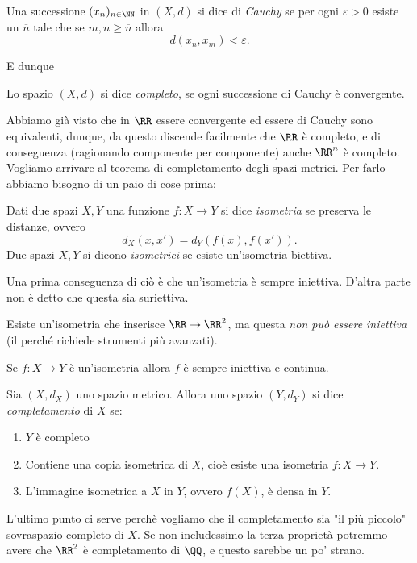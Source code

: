 \documentclass[11pt]{scrartcl}
\begin{document}
	\begin{definition}
		Una successione $(x_n)_{n\in\NN}$ in $(X,d)$ si dice di \textit{Cauchy} se per ogni $\varepsilon>0$ esiste un $\overline{n}$ tale che se $m,n\ge \overline{n}$ allora
		$$d\left(x_n,x_m\right)<\varepsilon.$$
	\end{definition}
	E dunque
	\begin{definition}
		Lo spazio $(X,d)$ si dice \textit{completo}, se ogni successione di Cauchy è convergente.
	\end{definition}
	Abbiamo già visto che in $\RR$ essere convergente ed essere di Cauchy sono equivalenti, dunque, da questo discende facilmente che $\RR$ è completo, e di conseguenza (ragionando componente per componente) anche $\RR^n$ è completo. \\
	Vogliamo arrivare al teorema di completamento degli spazi metrici. Per farlo abbiamo bisogno di un paio di cose prima:
	\begin{definition}[Isometria]
		Dati due spazi $X,Y$ una funzione $f:X\to Y$ si dice \textit{isometria} se preserva le distanze, ovvero
		$$d_X(x,x')=d_Y\left(f(x),f(x')\right).$$
		Due spazi $X,Y$ si dicono \textit{isometrici} se esiste un'isometria biettiva.
	\end{definition}
	Una prima conseguenza di ciò è che un'isometria è sempre iniettiva. D'altra parte non è detto che questa sia suriettiva.
	\begin{example}
		Esiste un'isometria che inserisce $\RR\to\RR^2$, ma questa \textit{non può essere iniettiva} (il perché richiede strumenti più avanzati).
	\end{example}
	\begin{remark}
		Se $f:X\to Y$ è un'isometria allora $f$ è sempre iniettiva e continua.
	\end{remark}
	\begin{definition}[Completamento]
		Sia $(X,d_X)$ uno spazio metrico. Allora uno spazio $(Y,d_Y)$ si dice \textit{completamento} di $X$ se:
		\begin{enumerate}
			\item $Y$ è completo
			\item Contiene una copia isometrica di $X$, cioè esiste una isometria $f:X\to Y$.
			\item L'immagine isometrica a $X$ in $Y$, ovvero $f(X)$, è densa in $Y$.
		\end{enumerate}
	\end{definition}
	L'ultimo punto ci serve perchè vogliamo che il completamento sia "il più piccolo" sovraspazio completo di $X$. Se non includessimo la terza proprietà potremmo avere che $\RR^2$ è completamento di $\QQ$, e questo sarebbe un po' strano.
\end{document}
